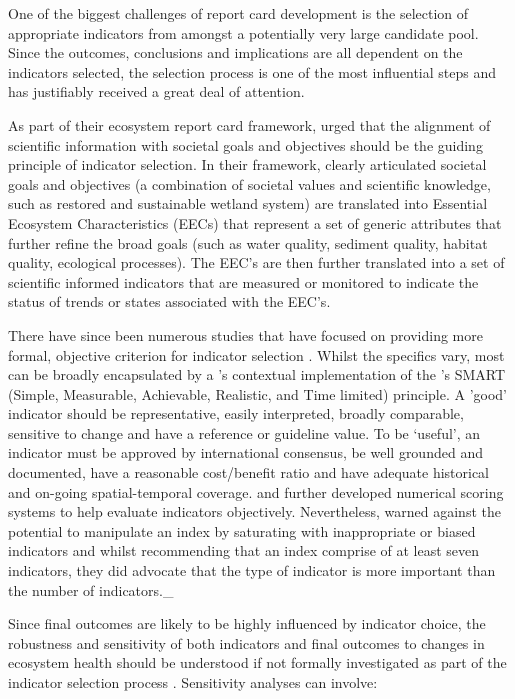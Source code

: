 One of the biggest challenges of report card development is the selection of appropriate indicators
from amongst a potentially very large candidate pool.  Since the outcomes, conclusions and
implications are all dependent on the indicators selected, the selection process is one of the most
influential steps and has justifiably received a great deal of attention.

As part of their ecosystem report card framework, \citet{Harwell-1999} urged that the alignment of
scientific information with societal goals and objectives should be the guiding principle of
indicator selection.  In their framework, clearly articulated societal goals and objectives (a
combination of societal values and scientific knowledge, such as restored and sustainable wetland
system) are translated into Essential Ecosystem Characteristics (EECs) that represent a set of
generic attributes that further refine the broad goals (such as water quality, sediment quality,
habitat quality, ecological processes).  The EEC's are then further translated into a set of
scientific informed indicators that are measured or monitored to indicate the status of trends or
states associated with the EEC's.
  
There have since been numerous studies that have focused on providing more formal, objective
criterion for indicator selection \citep{Dauvin-2008, Emerson-2012, Flint-2012, James-2012}.  Whilst
the specifics vary, most can be broadly encapsulated by a \citet{Dauvin-2008}'s contextual
implementation of the \citet{Doran-1981}'s SMART (Simple, Measurable, Achievable, Realistic, and
Time limited) principle.  A 'good' indicator should be representative, easily interpreted, broadly
comparable, sensitive to change and have a reference or guideline value.  To be `useful', an
indicator must be approved by international consensus, be well grounded and documented, have a
reasonable cost/benefit ratio and have adequate historical and on-going spatial-temporal coverage.
\citet{Flint-2012} and \citet{James-2012} further developed numerical scoring systems to help
evaluate indicators objectively.  Nevertheless, \citep{Neary-2012} warned against the potential to
manipulate an index by saturating with inappropriate or biased indicators and whilst recommending
that an index comprise of at least seven indicators, they did advocate that the type of indicator is
more important than the number of indicators._

Since final outcomes are likely to be highly influenced by indicator choice, the robustness and
sensitivity of both indicators and final outcomes to changes in ecosystem health should be
understood if not formally investigated as part of the indicator selection process
\citep{Dobbie-2013}.  Sensitivity analyses can involve:

